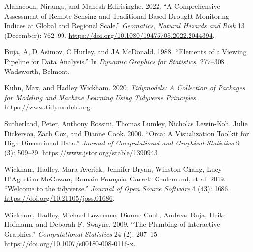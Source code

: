 \documentclass[
]{article}
\newlength{\cslhangindent}
\newlength{\cslentryspacingunit} %
\newenvironment{CSLReferences}[2] %
 {%
  \setlength{\parindent}{0pt}
  \ifodd #1
  \let\oldpar\par
  \def\par{\hangindent=\cslhangindent\oldpar}
  \fi
  \setlength{\parskip}{#2\cslentryspacingunit}
 }%
 {}
\begin{document}
\hypertarget{refs}{}
\begin{CSLReferences}{1}{0}
\leavevmode{}%
Alahacoon, Niranga, and Mahesh Edirisinghe. 2022. {``A Comprehensive
Assessment of Remote Sensing and Traditional Based Drought Monitoring
Indices at Global and Regional Scale.''} \emph{Geomatics, Natural
Hazards and Risk} 13 (December): 762--99.
\url{https://doi.org/10.1080/19475705.2022.2044394}.

\leavevmode{}%
Buja, A, D Asimov, C Hurley, and JA McDonald. 1988. {``Elements of a
Viewing Pipeline for Data Analysis.''} In \emph{Dynamic Graphics for
Statistics}, 277--308. Wadsworth, Belmont.

\leavevmode{}%
Kuhn, Max, and Hadley Wickham. 2020. \emph{Tidymodels: A Collection of
Packages for Modeling and Machine Learning Using Tidyverse Principles.}
\url{https://www.tidymodels.org}.

\leavevmode{}%
Sutherland, Peter, Anthony Rossini, Thomas Lumley, Nicholas Lewin-Koh,
Julie Dickerson, Zach Cox, and Dianne Cook. 2000. {``Orca: {A}
{Visualization} {Toolkit} for {High}-{Dimensional} {Data}.''}
\emph{Journal of Computational and Graphical Statistics} 9 (3): 509--29.
\url{https://www.jstor.org/stable/1390943}.

\leavevmode{}%
Wickham, Hadley, Mara Averick, Jennifer Bryan, Winston Chang, Lucy
D'Agostino McGowan, Romain François, Garrett Grolemund, et al. 2019.
{``Welcome to the {tidyverse}.''} \emph{Journal of Open Source Software}
4 (43): 1686. \url{https://doi.org/10.21105/joss.01686}.

\leavevmode{}%
Wickham, Hadley, Michael Lawrence, Dianne Cook, Andreas Buja, Heike
Hofmann, and Deborah F. Swayne. 2009. {``The Plumbing of Interactive
Graphics.''} \emph{Computational Statistics} 24 (2): 207--15.
\url{https://doi.org/10.1007/s00180-008-0116-x}.

\end{CSLReferences}
\end{document}
